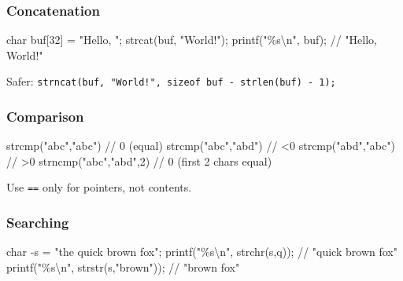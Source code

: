 \documentclass[
  letterpaper,
  DIV=11,
  numbers=noendperiod]{scrreprt}
\newenvironment{Shaded}{\begin{snugshade}}{\end{snugshade}}
\newcommand{\CharTok}[1]{\textcolor[rgb]{0.13,0.47,0.30}{#1}}
\newcommand{\CommentTok}[1]{\textcolor[rgb]{0.37,0.37,0.37}{#1}}
\newcommand{\DataTypeTok}[1]{\textcolor[rgb]{0.68,0.00,0.00}{#1}}
\newcommand{\DecValTok}[1]{\textcolor[rgb]{0.68,0.00,0.00}{#1}}
\newcommand{\NormalTok}[1]{\textcolor[rgb]{0.00,0.23,0.31}{#1}}
\newcommand{\OperatorTok}[1]{\textcolor[rgb]{0.37,0.37,0.37}{#1}}
\newcommand{\SpecialCharTok}[1]{\textcolor[rgb]{0.37,0.37,0.37}{#1}}
\newcommand{\StringTok}[1]{\textcolor[rgb]{0.13,0.47,0.30}{#1}}
\begin{document}
\subsubsection{Concatenation}\label{concatenation}

\begin{Shaded}
\begin{Highlighting}[]
\DataTypeTok{char}\NormalTok{ buf}\OperatorTok{[}\DecValTok{32}\OperatorTok{]} \OperatorTok{=} \StringTok{"Hello, "}\OperatorTok{;}
\NormalTok{strcat}\OperatorTok{(}\NormalTok{buf}\OperatorTok{,} \StringTok{"World!"}\OperatorTok{);}
\NormalTok{printf}\OperatorTok{(}\StringTok{"}\SpecialCharTok{\%s\textbackslash{}n}\StringTok{"}\OperatorTok{,}\NormalTok{ buf}\OperatorTok{);}  \CommentTok{// "Hello, World!"}
\end{Highlighting}
\end{Shaded}

Safer:
\texttt{strncat(buf,\ "World!",\ sizeof\ buf\ -\ strlen(buf)\ -\ 1);}

\subsubsection{Comparison}\label{comparison}

\begin{Shaded}
\begin{Highlighting}[]
\NormalTok{strcmp}\OperatorTok{(}\StringTok{"abc"}\OperatorTok{,}\StringTok{"abc"}\OperatorTok{)}   \CommentTok{// 0 (equal)}
\NormalTok{strcmp}\OperatorTok{(}\StringTok{"abc"}\OperatorTok{,}\StringTok{"abd"}\OperatorTok{)}   \CommentTok{// \textless{}0}
\NormalTok{strcmp}\OperatorTok{(}\StringTok{"abd"}\OperatorTok{,}\StringTok{"abc"}\OperatorTok{)}   \CommentTok{// \textgreater{}0}
\NormalTok{strncmp}\OperatorTok{(}\StringTok{"abc"}\OperatorTok{,}\StringTok{"abd"}\OperatorTok{,}\DecValTok{2}\OperatorTok{)} \CommentTok{// 0 (first 2 chars equal)}
\end{Highlighting}
\end{Shaded}

Use \texttt{==} only for pointers, not contents.

\subsubsection{Searching}\label{searching}

\begin{Shaded}
\begin{Highlighting}[]
\DataTypeTok{char} \OperatorTok{{-}}\NormalTok{s }\OperatorTok{=} \StringTok{"the quick brown fox"}\OperatorTok{;}
\NormalTok{printf}\OperatorTok{(}\StringTok{"}\SpecialCharTok{\%s\textbackslash{}n}\StringTok{"}\OperatorTok{,}\NormalTok{ strchr}\OperatorTok{(}\NormalTok{s}\OperatorTok{,}\CharTok{\textquotesingle{}q\textquotesingle{}}\OperatorTok{));}   \CommentTok{// "quick brown fox"}
\NormalTok{printf}\OperatorTok{(}\StringTok{"}\SpecialCharTok{\%s\textbackslash{}n}\StringTok{"}\OperatorTok{,}\NormalTok{ strstr}\OperatorTok{(}\NormalTok{s}\OperatorTok{,}\StringTok{"brown"}\OperatorTok{));} \CommentTok{// "brown fox"}
\end{Highlighting}
\end{Shaded}
\end{document}
